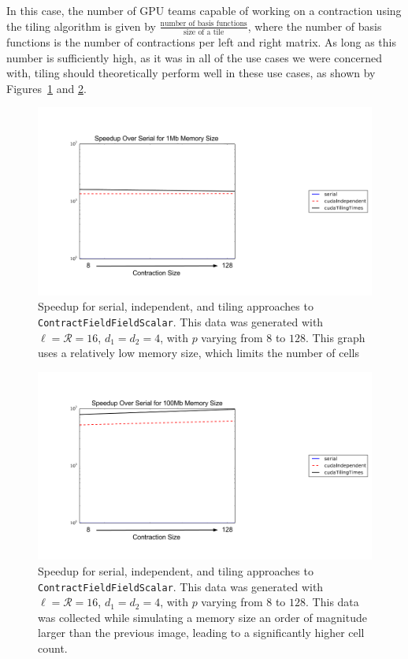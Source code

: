 In this case, the number of GPU teams
capable of working on a contraction using the tiling algorithm is given by
$\frac{\text{number of basis functions}}{\text{size of a tile}}$, where the number of basis functions
is the number of contractions per left and right matrix. As long as this number
is sufficiently high, as it was in all of the use cases we were concerned with, 
tiling should theoretically perform well in these use cases, as shown by
Figures~\ref{fig:multiDTiling1} and \ref{fig:multiDTiling2}.

\begin{figure}[H]
    \centering
    \includegraphics[scale = .4]{CFFTTiling1}
    \caption[\texttt{ContractFieldFieldScalar} tiling (small
    memory)]{Speedup for serial, independent, and tiling approaches to
        \texttt{ContractFieldFieldScalar}.  This data was generated with
        $\ell=\mathcal{R}=16$, $d_1=d_2=4$, with $p$
varying from $8$ to $128$. This graph uses a relatively low memory size, which
limits the number of cells}
\label{fig:multiDTiling1}
\end{figure}

\begin{figure}[H]
    \centering
\includegraphics[scale = .4]{CFFTTiling2}
\caption[\texttt{ContractFieldFieldScalar} tiling (large
memory)]{Speedup for serial, independent, and tiling approaches to
    \texttt{ContractFieldFieldScalar}. This data was generated with
    $\ell=\mathcal{R}=16$, $d_1=d_2=4$, with $p$ varying from $8$ to $128$. This
data was collected while simulating a memory size an order of magnitude larger
than the previous image, leading to a significantly higher cell count. }
\label{fig:multiDTiling2}
\end{figure}

